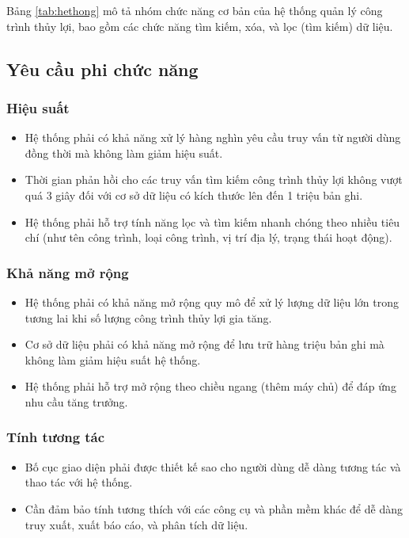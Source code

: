 \documentclass{article} %
\begin{document}
Bảng \ref{tab:hethong} mô tả nhóm chức năng cơ bản của hệ thống quản lý công trình thủy lợi, bao gồm các chức năng tìm kiếm, xóa, và lọc (tìm kiếm) dữ liệu.


\newpage


\subsection{Yêu cầu phi chức năng}

\subsubsection{Hiệu suất}

\begin{itemize}
    \item Hệ thống phải có khả năng xử lý hàng nghìn yêu cầu truy vấn từ người dùng đồng thời mà không làm giảm hiệu suất.
    \item Thời gian phản hồi cho các truy vấn tìm kiếm công trình thủy lợi không vượt quá 3 giây đối với cơ sở dữ liệu có kích thước lên đến 1 triệu bản ghi.
    \item Hệ thống phải hỗ trợ tính năng lọc và tìm kiếm nhanh chóng theo nhiều tiêu chí (như tên công trình, loại công trình, vị trí địa lý, trạng thái hoạt động).
\end{itemize}



\subsubsection{Khả năng mở rộng}
\begin{itemize}
    \item Hệ thống phải có khả năng mở rộng quy mô để xử lý lượng dữ liệu lớn trong tương lai khi số lượng công trình thủy lợi gia tăng.
    \item Cơ sở dữ liệu phải có khả năng mở rộng để lưu trữ hàng triệu bản ghi mà không làm giảm hiệu suất hệ thống.
    \item Hệ thống phải hỗ trợ mở rộng theo chiều ngang (thêm máy chủ) để đáp ứng nhu cầu tăng trưởng.
\end{itemize}
\subsubsection{Tính tương tác}
\begin{itemize}
    \item Bố cục giao diện phải được thiết kế sao cho người dùng dễ dàng tương tác và thao tác với hệ thống.
    \item Cần đảm bảo tính tương thích với các công cụ và phần mềm khác để dễ dàng truy xuất, xuất báo cáo, và phân tích dữ liệu.
\end{itemize}
\end{document}
